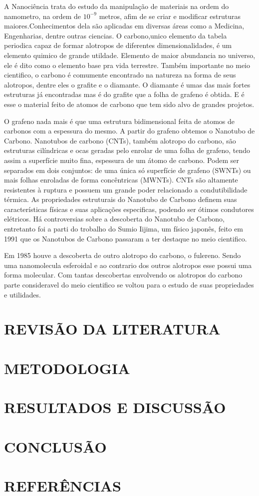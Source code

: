\documentclass[12pt,a4paper]{report}
\begin{document}
A Nanociência trata do estudo da manipulação  de materiais na ordem do namometro, na ordem de  \(10^{-9}\) metros, 
afim de se criar e modificar estruturas maiores.Conhecimentos dela são aplicadas em diversas áreas como a Medicina, 
Engenharias, dentre  outras ciencias.
O carbono,unico elemento da tabela periodica capaz de formar alotropos de diferentes dimensionalidades,  
é um elemento quimico de grande utildade. Elemento de maior abundancia no universo, ele é dito como o elemento 
base pra vida terrestre. Também importante  no meio cientifico, o carbono é comumente encontrado na natureza na 
forma de seus alotropos, dentre eles o grafite e o diamante. O diamante é umas das mais fortes estruturas já 
encontradas mas é do grafite que a folha de grafeno é obtida. E é esse o material feito de atomos de carbono que tem sido alvo de grandes projetos.

O grafeno nada mais é que uma estrutura bidimensional feita de atomos de carbonos com a espessura do mesmo.  
A partir do grafeno obtemos o Nanotubo de Carbono.
Nanotubos de carbono (CNTs), também alotropo do carbono,  são estruturas cilíndricas  e ocas geradas pelo 
enrolar de uma folha de grafeno, tendo assim a superfície muito fina,  espessura de um átomo de carbono. 
Podem ser separados em dois conjuntos:  de uma única só superfície de grafeno (SWNTs) ou mais folhas enroladas 
de forma concêntricas (MWNTs).  CNTs são altamente resistentes à ruptura e possuem um grande poder relacionado 
a condutibilidade térmica. As propriedades estruturais do Nanotubo de Carbono definem suas características 
físicas e suas aplicações especificas, podendo ser ótimos condutores elétricos.
Há controversias sobre a descoberta do Nanotubo de Carbono, entretanto foi a parti do trobalho do Sumio Iijima, 
um físico japonês, feito em 1991 que os Nanotubos de Carbono passaram a ter destaque no meio cientifico.

Em 1985 houve a descoberta de outro alotropo do carbono, o fulereno. Sendo uma  nanomolecula esferoidal 
e ao contrario dos outros alotropos esse possui uma forma molecular.
Com tantas descobertas  envolvendo os alotropos do carbono parte consideravel do meio cientifico se voltou 
para o estudo de suas propriedades e utilidades.



\chapter*{REVISÃO DA LITERATURA}

\chapter*{METODOLOGIA}

\chapter*{RESULTADOS E DISCUSSÃO}

\chapter*{CONCLUSÃO}

\chapter*{REFERÊNCIAS}


\end{document}
